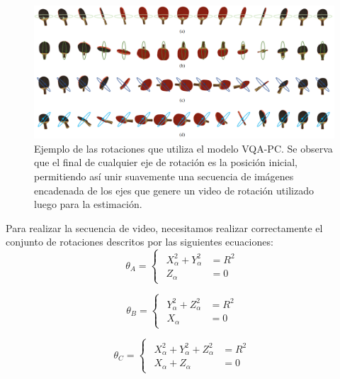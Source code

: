 \begin{figure}
  \begin{center}
    \includegraphics[width=.95\textwidth]{imagenes/chapter4/VQARotation}
  \end{center}
  \caption[Ejemplo de las rotaciones que utiliza el modelo VQA-PC.]
  {Ejemplo de las rotaciones que utiliza el modelo VQA-PC.
  Se observa que el final de cualquier eje de rotación es la posición inicial, 
permitiendo así unir suavemente una secuencia de imágenes encadenada de los ejes 
que genere un video de rotación utilizado luego para la estimación.}
  \label{fig:VQARotation}
\end{figure}

Para realizar la secuencia de video, necesitamos realizar correctamente 
el conjunto de rotaciones descritos por las siguientes ecuaciones: 
\begin{equation}
  \theta_A = 
\begin{cases}
\begin{aligned}
   X_\alpha^2 + Y_\alpha^2 & = R^2 \\ 
    Z_\alpha & = 0 
\end{aligned}
\end{cases}
\label{eq:RotationA}
\end{equation}

\begin{equation}
  \theta_B = 
\begin{cases}
\begin{aligned}
   Y_\alpha^2 + Z_\alpha^2 & = R^2 \\ 
    X_\alpha & = 0 
\end{aligned}
\end{cases}
\label{eq:RotationB}
\end{equation}

\begin{equation}
  \theta_C = 
\begin{cases}
\begin{aligned}
   X_\alpha^2 + Y_\alpha^2 + Z_\alpha^2 & = R^2 \\ 
    X_\alpha + Z_\alpha & = 0 
\end{aligned}
\end{cases}
\label{eq:RotationC}
\end{equation}

